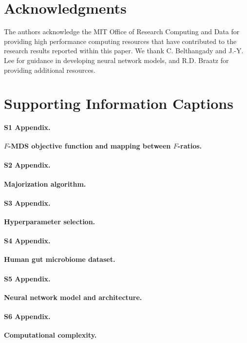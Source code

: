 \documentclass[10pt,letterpaper]{article}
\newcommand{\1}{{\rm 1}\kern-0.24em{\rm I}}
\begin{document}
\section*{Acknowledgments}
The authors acknowledge the MIT Office of Research Computing and Data for providing high performance computing resources that have contributed to the research results reported within this paper. We thank C. Belthangady and J.-Y. Lee for guidance in developing neural network models, and R.D. Braatz for providing additional resources.


\nolinenumbers




\section*{Supporting Information Captions}

\paragraph*{S1 Appendix.}
\label{sec:app1}
{\bf $F$-MDS objective function and mapping between $F$-ratios.}

\paragraph*{S2 Appendix.}
\label{sec:app2}
{\bf Majorization algorithm.}

\paragraph*{S3 Appendix.}
\label{sec:app3_rev}
{\bf Hyperparameter selection.}

\paragraph*{S4 Appendix.}
\label{sec:app4_rev}
{\bf Human gut microbiome dataset.}

\paragraph*{S5 Appendix.}
\label{sec:app5_rev}
{\bf Neural network model and architecture.}

\paragraph*{S6 Appendix.}
\label{sec:app6_rev}
{\bf Computational complexity.}
\end{document}
